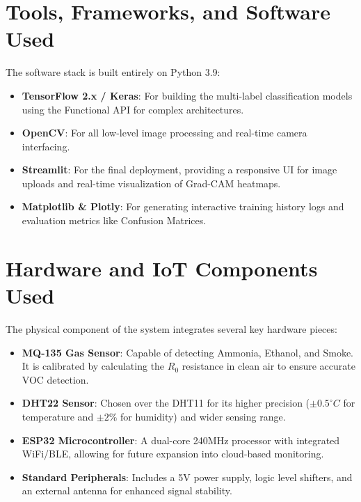 \section[Tools, Frameworks, and Software Used]{\textbf{Tools, Frameworks, and Software Used}}
The software stack is built entirely on Python 3.9:
\begin{itemize}
    \item \textbf{TensorFlow 2.x / Keras}: For building the multi-label classification models using the Functional API for complex architectures.
    \item \textbf{OpenCV}: For all low-level image processing and real-time camera interfacing.
    \item \textbf{Streamlit}: For the final deployment, providing a responsive UI for image uploads and real-time visualization of Grad-CAM heatmaps.
    \item \textbf{Matplotlib \& Plotly}: For generating interactive training history logs and evaluation metrics like Confusion Matrices.
\end{itemize}

\section[Hardware and IoT Components Used]{\textbf{Hardware and IoT Components Used}}
The physical component of the system integrates several key hardware pieces:
\begin{itemize}
    \item \textbf{MQ-135 Gas Sensor}: Capable of detecting Ammonia, Ethanol, and Smoke. It is calibrated by calculating the $R_0$ resistance in clean air to ensure accurate VOC detection.
    \item \textbf{DHT22 Sensor}: Chosen over the DHT11 for its higher precision ($\pm 0.5^{\circ}C$ for temperature and $\pm 2\%$ for humidity) and wider sensing range.
    \item \textbf{ESP32 Microcontroller}: A dual-core 240MHz processor with integrated WiFi/BLE, allowing for future expansion into cloud-based monitoring.
    \item \textbf{Standard Peripherals}: Includes a 5V power supply, logic level shifters, and an external antenna for enhanced signal stability.
\end{itemize}
